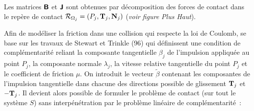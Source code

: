 Les matrices $\bm{\mathsf{B}}$ et $\bm{\mathsf{J}}$ sont obtenues par décomposition des forces de contact dans le repère de contact $\mathcal{R}_{\Omega_j} = (P_j, \bm{\mathrm{T}}_j, \bm{\mathrm{N}}_j)$ (\textit{voir figure Plus Haut}).

Afin de modéliser la friction dans une collision qui respecte la loi de Coulomb, \parencite{rabatel2015thesis} se base sur les travaux de Stewart et Trinkle (96) qui définissent une condition de complémentarité reliant la composante tangentielle $\beta_j$ de l'impulsion appliquée au point $P_j$, la composante normale $\lambda_j$, la vitesse relative tangentielle du point $P_j$ et le coefficient de friction $\mu$. On introduit le vecteur $\tilde{\beta}$ contenant les composantes de l'impulsion tangentielle dans chacune des directions possible de glissement $\bm{\mathrm{T}}_j$ et $-\bm{\mathrm{T}}_j$. Il devient alors possible de formuler le problème de contact (sur tout le système $S$) sans interpénétration par le problème linéaire de complémentarité :
